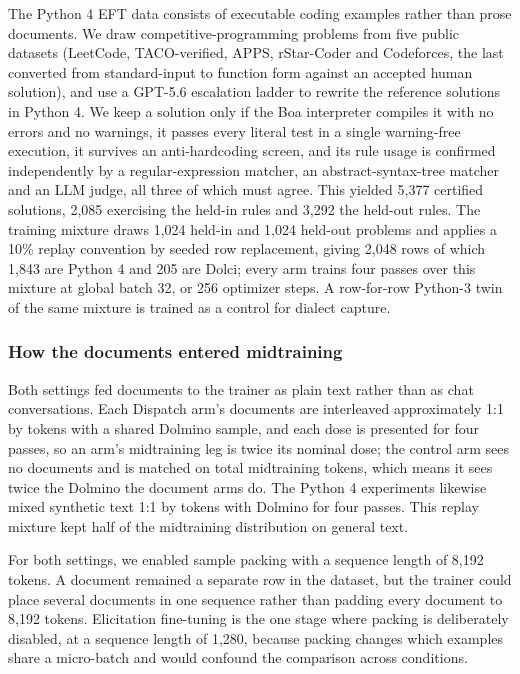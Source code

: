 The Python 4 EFT data consists of executable coding examples rather than prose documents. We draw competitive-programming problems from five public datasets (LeetCode, TACO-verified, APPS, rStar-Coder and Codeforces, the last converted from standard-input to function form against an accepted human solution), and use a GPT-5.6 escalation ladder to rewrite the reference solutions in Python 4. We keep a solution only if the Boa interpreter compiles it with no errors and no warnings, it passes every literal test in a single warning-free execution, it survives an anti-hardcoding screen, and its rule usage is confirmed independently by a regular-expression matcher, an abstract-syntax-tree matcher and an LLM judge, all three of which must agree. This yielded 5,377 certified solutions, 2,085 exercising the held-in rules and 3,292 the held-out rules. The training mixture draws 1,024 held-in and 1,024 held-out problems and applies a 10\% replay convention by seeded row replacement, giving 2,048 rows of which 1,843 are Python 4 and 205 are Dolci; every arm trains four passes over this mixture at global batch 32, or 256 optimizer steps. A row-for-row Python-3 twin of the same mixture is trained as a control for dialect capture.

\subsubsection{How the documents entered midtraining}
Both settings fed documents to the trainer as plain text rather than as chat conversations. Each Dispatch arm's documents are interleaved approximately 1:1 by tokens with a shared Dolmino sample, and each dose is presented for four passes, so an arm's midtraining leg is twice its nominal dose; the control arm sees no documents and is matched on total midtraining tokens, which means it sees twice the Dolmino the document arms do. The Python 4 experiments likewise mixed synthetic text 1:1 by tokens with Dolmino for four passes. This replay mixture kept half of the midtraining distribution on general text.

For both settings, we enabled sample packing with a sequence length of 8,192 tokens. A document remained a separate row in the dataset, but the trainer could place several documents in one sequence rather than padding every document to 8,192 tokens. Elicitation fine-tuning is the one stage where packing is deliberately disabled, at a sequence length of 1,280, because packing changes which examples share a micro-batch and would confound the comparison across conditions.

